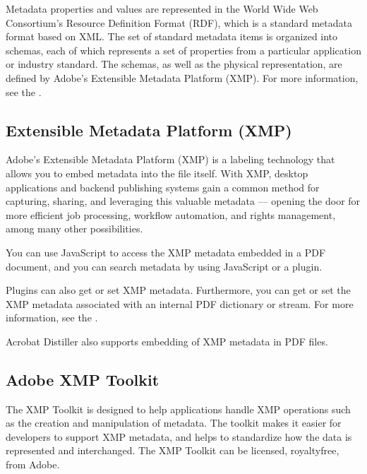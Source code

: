 \documentclass[letterpaper,12pt,english,openany,oneside]{sphinxmanual}
\begin{document}
Metadata properties and values are represented in the World Wide Web Consortium’s Resource Definition Format (RDF), which is a standard metadata format based on XML. The set of standard metadata items is organized into schemas, each of which represents a set of properties from a particular application or industry standard. The schemas, as well as the physical representation, are defined by Adobe’s Extensible Metadata Platform (XMP). For more information, see the  .




\subsection{Extensible Metadata Platform (XMP)}
\label{\detokenize{Overview_Metadata:extensible-metadata-platform-xmp}}
Adobe’s Extensible Metadata Platform (XMP) is a labeling technology that allows you to embed metadata into the file itself. With XMP, desktop applications and back\sphinxhyphen{}end publishing systems gain a common method for capturing, sharing, and leveraging this valuable metadata — opening the door for more efficient job processing, workflow automation, and rights management, among many other possibilities.

You can use JavaScript to access the XMP metadata embedded in a PDF document, and you can search metadata by using JavaScript or a plug\sphinxhyphen{}in.

Plug\sphinxhyphen{}ins can also get or set XMP metadata. Furthermore, you can get or set the XMP metadata associated with an internal PDF dictionary or stream. For more information, see the  .

Acrobat Distiller also supports embedding of XMP metadata in PDF files.




\subsection{Adobe XMP Toolkit}
\label{\detokenize{Overview_Metadata:adobe-xmp-toolkit}}
The XMP Toolkit is designed to help applications handle XMP operations such as the creation and manipulation of metadata. The toolkit makes it easier for developers to support XMP metadata, and helps to standardize how the data is represented and interchanged. The XMP Toolkit can be licensed, royalty\sphinxhyphen{}free, from Adobe.
\end{document}
